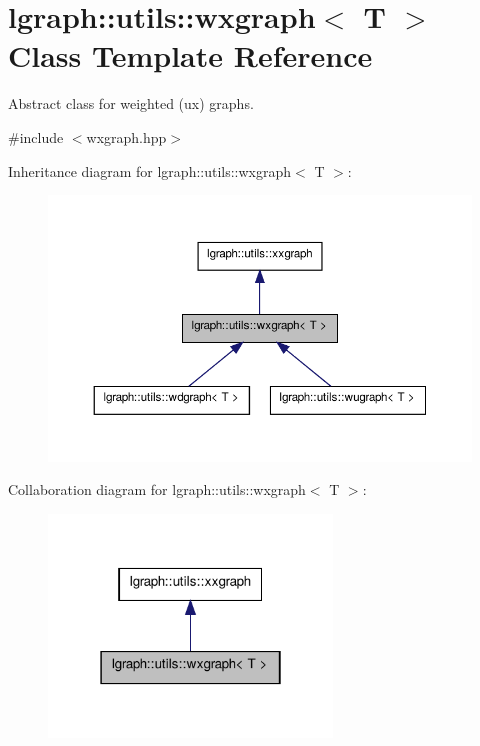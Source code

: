 \hypertarget{classlgraph_1_1utils_1_1wxgraph}{\section{lgraph\-:\-:utils\-:\-:wxgraph$<$ T $>$ Class Template Reference}
\label{classlgraph_1_1utils_1_1wxgraph}
}


Abstract class for weighted (ux) graphs.  




{\ttfamily \#include $<$wxgraph.\-hpp$>$}



Inheritance diagram for lgraph\-:\-:utils\-:\-:wxgraph$<$ T $>$\-:\nopagebreak
\begin{figure}[H]
\begin{center}
\leavevmode
\includegraphics[width=350pt]{classlgraph_1_1utils_1_1wxgraph__inherit__graph}
\end{center}
\end{figure}


Collaboration diagram for lgraph\-:\-:utils\-:\-:wxgraph$<$ T $>$\-:\nopagebreak
\begin{figure}[H]
\begin{center}
\leavevmode
\includegraphics[width=214pt]{classlgraph_1_1utils_1_1wxgraph__coll__graph}
\end{center}
\end{figure}
